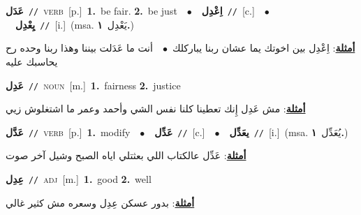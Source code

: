 \documentclass[10pt,a4paper,twoside]{article} %
\begin{document}
\begin{multicols}{2}
{\setlength\topsep{0pt}\textbf{\foreignlanguage{arabic}{عَدَل}}\ {\color{gray}\texttt{//}\color{black}}\ \textsc{verb}\ [p.]\ \textbf{1.}~be fair.  \textbf{2.}~be just\ \ $\bullet$\ \ \setlength\topsep{0pt}\textbf{\foreignlanguage{arabic}{اِعْدِل}}\ {\color{gray}\texttt{//}\color{black}}\ [c.]\ \ $\bullet$\ \ \setlength\topsep{0pt}\textbf{\foreignlanguage{arabic}{يِعْدِل}}\ {\color{gray}\texttt{//}\color{black}}\ [i.]\ \color{gray}(msa. \foreignlanguage{arabic}{يَعْدِل}~\foreignlanguage{arabic}{\textbf{١.}})\color{black}\  \begin{flushright}\color{gray}\foreignlanguage{arabic}{\textbf{\underline{\foreignlanguage{arabic}{أمثلة}}}: اِعْدِل بين اخوتك يما عشان ربنا يباركلك\ $\bullet$\ \  أنت ما عَدَلت بيننا وهذا ربنا وحده رح يحاسبك عليه}\end{flushright}\color{black}} \vspace{2mm}

{\setlength\topsep{0pt}\textbf{\foreignlanguage{arabic}{عَدِل}}\ {\color{gray}\texttt{//}\color{black}}\ \textsc{noun}\ [m.]\ \textbf{1.}~fairness  \textbf{2.}~justice\  \begin{flushright}\color{gray}\foreignlanguage{arabic}{\textbf{\underline{\foreignlanguage{arabic}{أمثلة}}}: مش عَدِل إِنك تعطينا كلنا نفس الشي وأحمد وعمر ما اشتغلوش زيي}\end{flushright}\color{black}} \vspace{2mm}

{\setlength\topsep{0pt}\textbf{\foreignlanguage{arabic}{عَدَّل}}\ {\color{gray}\texttt{//}\color{black}}\ \textsc{verb}\ [p.]\ \textbf{1.}~modify\ \ $\bullet$\ \ \setlength\topsep{0pt}\textbf{\foreignlanguage{arabic}{عَدِّل}}\ {\color{gray}\texttt{//}\color{black}}\ [c.]\ \ $\bullet$\ \ \setlength\topsep{0pt}\textbf{\foreignlanguage{arabic}{يعَدِّل}}\ {\color{gray}\texttt{//}\color{black}}\ [i.]\ \color{gray}(msa. \foreignlanguage{arabic}{يُعَدِّل}~\foreignlanguage{arabic}{\textbf{١.}})\color{black}\  \begin{flushright}\color{gray}\foreignlanguage{arabic}{\textbf{\underline{\foreignlanguage{arabic}{أمثلة}}}: عَدِّل عالكتاب اللي بعثتلي اياه الصبح وشيل آخر صوت}\end{flushright}\color{black}} \vspace{2mm}

{\setlength\topsep{0pt}\textbf{\foreignlanguage{arabic}{عِدِل}}\ {\color{gray}\texttt{//}\color{black}}\ \textsc{adj}\ [m.]\ \textbf{1.}~good  \textbf{2.}~well\  \begin{flushright}\color{gray}\foreignlanguage{arabic}{\textbf{\underline{\foreignlanguage{arabic}{أمثلة}}}: بدور عسكن عِدِل وسعره مش كثير غالي}\end{flushright}\color{black}} \vspace{2mm}


\end{multicols}
\end{document}
